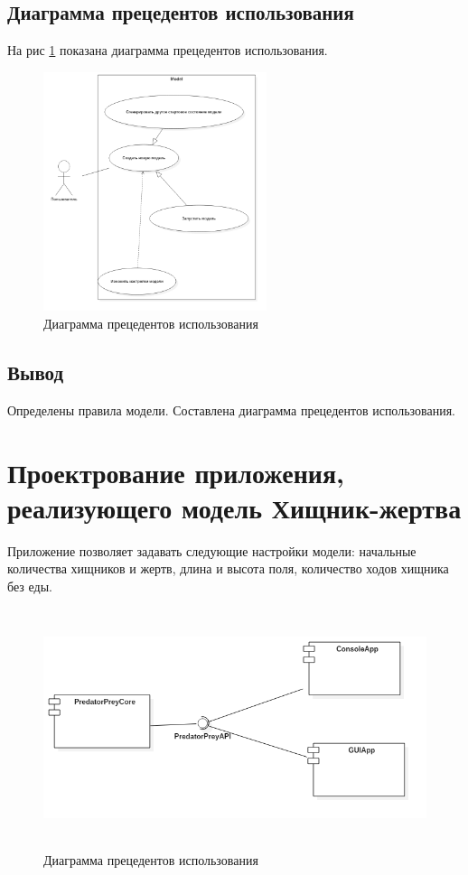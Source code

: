 \documentclass[a4paper]{article}
\begin{document}
\subsection{Диаграмма прецедентов использования}
На рис \ref{pic:UseCaseDiagram1} показана диаграмма прецедентов использования.
\begin{figure}[H]
	\begin{center}
		\includegraphics[scale=0.4, height=7cm]{pictures/UseCaseDiagram}
		\caption{Диаграмма прецедентов использования} 
		\label{pic:UseCaseDiagram1} %
	\end{center}
\end{figure}

\subsection{Вывод}
Определены правила модели. Составлена диаграмма прецедентов использования.
\section{Проектрование приложения, реализующего модель Хищник-жертва}
Приложение позволяет задавать следующие настройки модели: начальные количества хищников и жертв, длина и высота поля, количество ходов хищника без еды. 

\begin{figure}[H]
	\begin{center}
		\includegraphics[scale=0.4, height=7cm]{pictures/ComponentDiagram1}
		\caption{Диаграмма прецедентов использования} 
		\label{pic:ComponentDiagram} %
	\end{center}
\end{figure}
\end{document}

